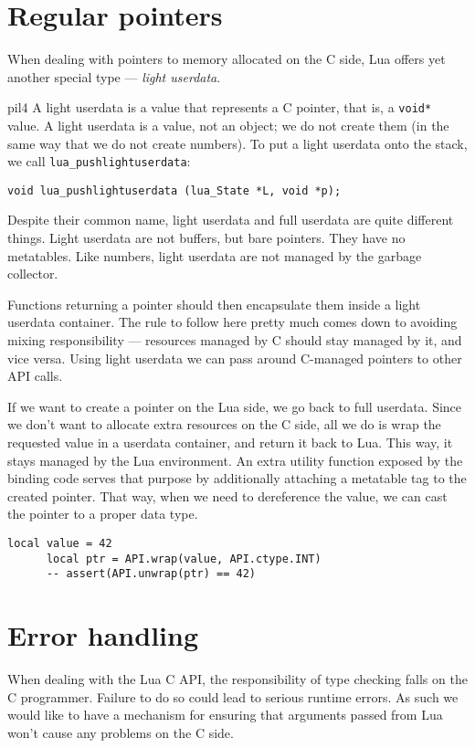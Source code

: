 \documentclass[polish, english]{iithesis}
\begin{document}
  \section{Regular pointers}
    When dealing with pointers to memory allocated on the C side, Lua offers yet another special type --- \textit{light userdata}.
    \begin{displaycquote}{pil4}
      A light userdata is a value that represents a C pointer, that is, a \texttt{void*} value. 
      A light userdata is a value, not an object; we do not create them (in the same way that we do not create numbers). 
      To put a light userdata onto the stack, we call \texttt{lua\_pushlightuserdata}:

      \begin{center}
      \texttt{void lua\_pushlightuserdata (lua\_State *L, void *p);}
      \end{center}
      
      Despite their common name, light userdata and full userdata are quite different things. 
      Light userdata are not buffers, but bare pointers. 
      They have no metatables. 
      Like numbers, light userdata are not managed by the garbage collector.
    \end{displaycquote}
    Functions returning a pointer should then encapsulate them inside a light userdata container.
    The rule to follow here pretty much comes down to avoiding mixing responsibility --- resources managed by C should stay managed by it, and vice versa.
    Using light userdata we can pass around C-managed pointers to other API calls.

    If we want to create a pointer on the Lua side, we go back to full userdata.
    Since we don't want to allocate extra resources on the C side, all we do is wrap the requested value in a userdata container, and return it back to Lua.
    This way, it stays managed by the Lua environment. 
    An extra utility function exposed by the binding code serves that purpose by additionally attaching a metatable tag to the created pointer.
    That way, when we need to dereference the value, we can cast the pointer to a proper data type.
    \begin{lstlisting}[language={[5.2]Lua}, caption=Creating an \texttt{int} pointer in a \texttt{.lua} script]
      local value = 42
      local ptr = API.wrap(value, API.ctype.INT)
      -- assert(API.unwrap(ptr) == 42)
    \end{lstlisting}
  \section{Error handling}
    When dealing with the Lua C API, the responsibility of type checking falls on the C programmer.
    Failure to do so could lead to serious runtime errors.
    As such we would like to have a mechanism for ensuring that arguments passed from Lua won't cause any problems on the C side.
\end{document}
